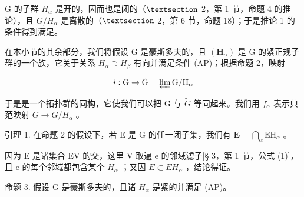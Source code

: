 G 的子群 \(H_{\alpha}\) 是开的，因而也是闭的（\(\S\) 2，第 1 节，命题 4 的推论），且 \(G/H_{\alpha}\) 是离散的（\(\S\) 2，第 6 节，命题 18）；于是推论 1 的条件得到满足。

在本小节的其余部分，我们将假设 G 是豪斯多夫的，且 \((\mathbf{H}_{\alpha})\) 是 G 的紧正规子群的一个族，它关于关系 \(H_{\alpha} \supset H_{\beta}\) 有向并满足条件 (AP)；根据命题 2，映射

\[
i: \mathrm{G} \rightarrow \tilde {\mathrm{G}} = \varprojlim \mathrm{G} / \mathrm{H} _ {\alpha}
\]

于是是一个拓扑群的同构，它使我们可以把 G 与 \(\tilde{G}\) 等同起来。我们用 \(f_{\alpha}\) 表示典范映射 \(G \rightarrow G/H_{\alpha}\) 。

引理 1. 在命题 2 的假设下，若 E 是 G 的任一闭子集，我们有 \(\mathbf{E} = \bigcap_{\alpha} \mathrm{EH}_{\alpha}\) 。

因为 E 是诸集合 EV 的交，这里 V 取遍 e 的邻域滤子{[}§ 3，第 1 节，公式 (1){]}，且 e 的每个邻域都包含某个 \(H_{\alpha}\) ；又因 \(E \subset EH_{\alpha}\) ，结论得证。

命题 3. 假设 G 是豪斯多夫的，且诸 \(H_{\alpha}\) 是紧的并满足 (AP)。

